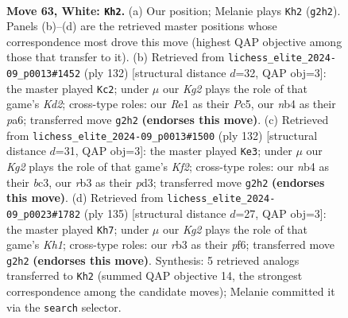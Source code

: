 \documentclass[11pt]{article}
\begin{document}
\clearpage

\begin{figure}[p]\centering
\begin{subfigure}{0.46\textwidth}\centering
\resizebox{\linewidth}{!}{%
\newchessgame
\chessboard[
  setfen={3R4/kp5p/6pP/p4p2/1n3P2/1r6/6K1/4R3 w - - 13 63},
  showmover=false,
  pgfstyle=straightmove, color=movearrow, markmove={g2-h2}
]}
\caption{}
\end{subfigure}\hfill
\begin{subfigure}{0.46\textwidth}\centering
\resizebox{\linewidth}{!}{%
\newchessgame
\chessboard[
  setfen={2R5/5p2/p3p3/2P1Ppk1/8/8/3K4/1r6 w - - 3 67},
  showmover=false,
  pgfstyle=straightmove, color=movearrow, markmove={d2-c2}
]}
\caption{}
\end{subfigure}
\\[4pt]
\begin{subfigure}{0.46\textwidth}\centering
\resizebox{\linewidth}{!}{%
\newchessgame
\chessboard[
  setfen={8/7p/7P/N2k2p1/1p2p1P1/2bp4/5K2/8 w - - 0 67},
  showmover=false,
  pgfstyle=straightmove, color=movearrow, markmove={f2-e3}
]}
\caption{}
\end{subfigure}\hfill
\begin{subfigure}{0.46\textwidth}\centering
\resizebox{\linewidth}{!}{%
\newchessgame
\chessboard[
  setfen={7k/4N3/1p3P1P/1P4K1/p7/P7/1P6/8 b - - 0 68},
  showmover=false,
  pgfstyle=straightmove, color=movearrow, markmove={h8-h7}
]}
\caption{}
\end{subfigure}
\caption{\textbf{Move 63, White: \texttt{Kh2}.} (a) Our position; Melanie plays \texttt{Kh2} (\texttt{g2h2}). Panels (b)--(d) are the retrieved master positions whose correspondence most drove this move (highest QAP objective among those that transfer to it). (b) Retrieved from \texttt{lichess\_elite\_2024-09\_p0013\#1452} (ply 132) [structural distance $d$=32, QAP obj=3]: the master played \texttt{Kc2}; under $\mu$ our \emph{Kg2} plays the role of that game's \emph{Kd2}; cross-type roles: our \emph{R}e1 as their \emph{P}c5, our \emph{n}b4 as their \emph{p}a6; transferred move \texttt{g2h2} \textbf{(endorses this move)}. (c) Retrieved from \texttt{lichess\_elite\_2024-09\_p0013\#1500} (ply 132) [structural distance $d$=31, QAP obj=3]: the master played \texttt{Ke3}; under $\mu$ our \emph{Kg2} plays the role of that game's \emph{Kf2}; cross-type roles: our \emph{n}b4 as their \emph{b}c3, our \emph{r}b3 as their \emph{p}d3; transferred move \texttt{g2h2} \textbf{(endorses this move)}. (d) Retrieved from \texttt{lichess\_elite\_2024-09\_p0023\#1782} (ply 135) [structural distance $d$=27, QAP obj=3]: the master played \texttt{Kh7}; under $\mu$ our \emph{Kg2} plays the role of that game's \emph{Kh1}; cross-type roles: our \emph{r}b3 as their \emph{p}f6; transferred move \texttt{g2h2} \textbf{(endorses this move)}. Synthesis: 5 retrieved analogs transferred to \texttt{Kh2} (summed QAP objective 14, the strongest correspondence among the candidate moves); Melanie committed it via the \texttt{search} selector.}
\label{fig:thought-m124}
\end{figure}
\end{document}
